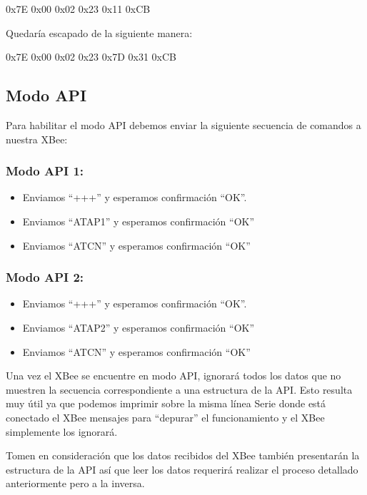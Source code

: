 \documentclass[11pt,oneside,spanish,a4paper]{article}
\begin{document}
0x7E 0x00 0x02 0x23 0x11 0xCB

Quedaría escapado de la siguiente manera:

0x7E 0x00 0x02 0x23 0x7D 0x31 0xCB

\subsection{Modo API}
Para habilitar el modo API debemos enviar la siguiente secuencia de comandos a nuestra XBee:
\subsubsection{Modo API 1:}
\begin{itemize}
	\item Enviamos ``+++'' y esperamos confirmaci\'on ``OK''.
	\item Enviamos ``ATAP1'' y esperamos confirmaci\'on ``OK''
	\item Enviamos ``ATCN'' y esperamos confirmaci\'on ``OK''
\end{itemize}
\subsubsection{Modo API 2:}
\begin{itemize}
	\item Enviamos ``+++'' y esperamos confirmaci\'on ``OK''.
	\item Enviamos ``ATAP2'' y esperamos confirmaci\'on ``OK''
	\item Enviamos ``ATCN'' y esperamos confirmaci\'on ``OK''
\end{itemize}
Una vez el XBee se encuentre en modo API, ignorará todos los datos que no muestren la secuencia correspondiente a una estructura de la API. Esto resulta muy útil ya que podemos imprimir sobre la misma línea Serie donde está conectado el XBee mensajes para ``depurar'' el funcionamiento y el XBee simplemente los ignorará.

Tomen en consideración que los datos recibidos del XBee también presentarán la estructura de la API así que leer los datos requerirá realizar el proceso detallado anteriormente pero a la inversa.
\end{document}
